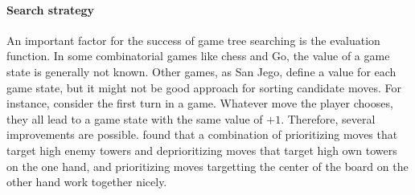 \documentclass[sigconf]{acmart}
\newcommand{\bl}{\node [circle, minimum size=0.7cm, draw=black, fill=blue!65!white, thin]{};}
\newcommand{\wh}{\node [rectangle, minimum size=0.7cm, draw=black, fill=yellow] {};}
\begin{document}
\paragraph{Search strategy}
An important factor for the success of game tree searching is the evaluation function.
In some combinatorial games like chess and Go, the value of a game state is generally not known.
Other games, as San Jego, define a value for each game state, but it might not be good approach for sorting candidate moves.
For instance, consider the first turn in a game.
Whatever move the player chooses, they all lead to a game state with the same value of $+1$.
Therefore, several improvements are possible.
\citeauthor{Althöfer2020} found that a combination of prioritizing moves that target high enemy towers and deprioritizing moves that target high own towers on the one hand, and prioritizing moves targetting the center of the board on the other hand work together nicely.



\begin{itemize}
\end{itemize}
\end{document}
